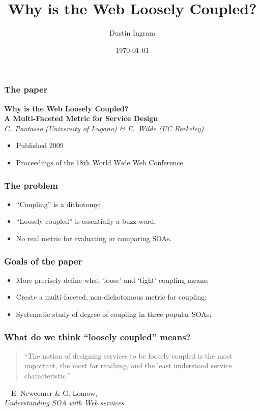 \documentclass{beamer}
\title{Why is the Web Loosely Coupled?}
\author{Dustin Ingram}
\institute{Advances in Software Design, Spring 12-13\\ Drexel University
Department of Computer Science}
\date{\today}
\begin{document}
\maketitle

\begin{frame}
    \frametitle{The paper}
    \textbf{Why is the Web Loosely Coupled?}\\
    \textbf{A Multi-Faceted Metric for Service Design}\\
    \emph{C.~Pautasso (University of Lugano) \& E.~Wilde (UC Berkeley)}\\
    \begin{itemize}
        \item{Published 2009}
        \item{Proceedings of the 18th World Wide Web Conference}
    \end{itemize}
\end{frame}

\begin{frame}
    \frametitle{The problem}
    \begin{itemize}
        \item{``Coupling'' is a dichotomy;}
        \item{``Loosely coupled'' is essentially a buzz-word;}
        \item{No real metric for evaluating or comparing SOAs.}
    \end{itemize}
\end{frame}

\begin{frame}
    \frametitle{Goals of the paper}
    \begin{itemize}
        \item{More precisely define what `loose' and `tight' coupling means;}
        \item{Create a multi-faceted, non-dichotomous metric for coupling;}
        \item{Systematic study of degree of coupling in three popular SOAs;}
    \end{itemize}
\end{frame}

\begin{frame}
    \frametitle{What do we think ``loosely coupled'' means?}
    \begin{quote}
        ``The notion of designing services to be loosely coupled is the most important,  the most far  reaching, and the least understood service characteristic.''
    \end{quote}
    \hfill ---E. Newcomer \& G. Lomow,\\\hfill \emph{Understanding SOA with Web services}

\end{frame}
\end{document}
